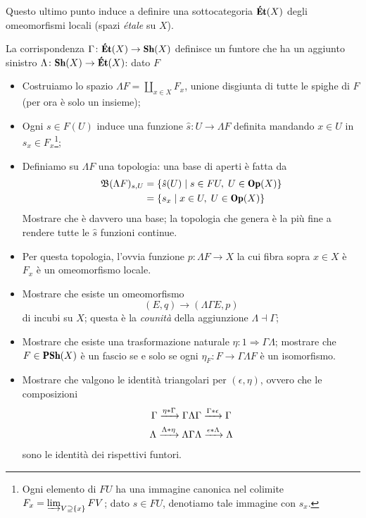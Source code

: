 Questo ultimo punto induce a definire una sottocategoria $\cate{\'Et}(X)$ degli omeomorfismi locali (spazi \emph{\'etale} su $X$).
\begin{MyExercise}
La corrispondenza $\Gamma\colon \cate{\'Et}(X)\to \cate{Sh}(X)$ definisce un funtore che ha un aggiunto sinistro $\Lambda\colon \cate{Sh}(X)\to \cate{\'Et}(X)$: dato $F$
\begin{itemize}
\item Costruiamo lo spazio $\Lambda F = \coprod_{x\in X} F_x$, unione disgiunta di tutte le spighe di $F$ (per ora \`e solo un insieme);
\item Ogni $s\in F(U)$ induce una funzione $\hat s\colon U\to \Lambda F$ definita mandando $x\in U$ in $s_x\in F_x$\footnote{Ogni elemento di $FU$ ha una immagine canonica nel colimite $F_x = \varinjlim_{V\supseteq\{x\}} FV$; dato $s\in FU$, denotiamo tale immagine con $s_x$.};
\item Definiamo su $\Lambda F$ una topologia: una base di aperti \`e fatta da
\begin{align*}
\mathfrak{B}(\Lambda F)_{s, U} &= \{\hat s(U)\mid s\in FU,\; U\in \cate{Op}(X) \}\\
& = \{ s_x\mid x\in U,\; U\in \cate{Op}(X) \}
\end{align*}
Mostrare che \`e davvero una base; la topologia che genera \`e la pi\`u fine a rendere tutte le $\hat s$ funzioni continue.
\item Per questa topologia, l'ovvia funzione $p\colon \Lambda F\to X$ la cui fibra sopra $x\in X$ \`e $F_x$ \`e un omeomorfismo locale.
\item Mostrare che esiste un omeomorfismo 
\[
(E, q) \to (\Lambda \Gamma E, p)
\]
di incubi su $X$; questa \`e la \emph{counit\`a} della aggiunzione $\Lambda\dashv \Gamma$;
\item Mostrare che esiste una trasformazione naturale $\eta\colon 1\Rightarrow \Gamma\Lambda$; mostrare che $F\in \cate{PSh}(X)$ \`e un fascio se e solo se ogni $\eta_F\colon F\to \Gamma \Lambda F$ \`e un isomorfismo.
\item Mostrare che valgono le identit\`a triangolari per $(\epsilon,\eta)$, ovvero che le composizioni
\begin{gather*}
\Gamma \xrightarrow{\eta * \Gamma} \Gamma\Lambda\Gamma \xrightarrow{\Gamma * \epsilon}\Gamma \\
\Lambda \xrightarrow{\Lambda * \eta} \Lambda\Gamma\Lambda \xrightarrow{\epsilon * \Lambda} \Lambda
\end{gather*}
sono le identit\`a dei rispettivi funtori.
\end{itemize}
\end{MyExercise}
